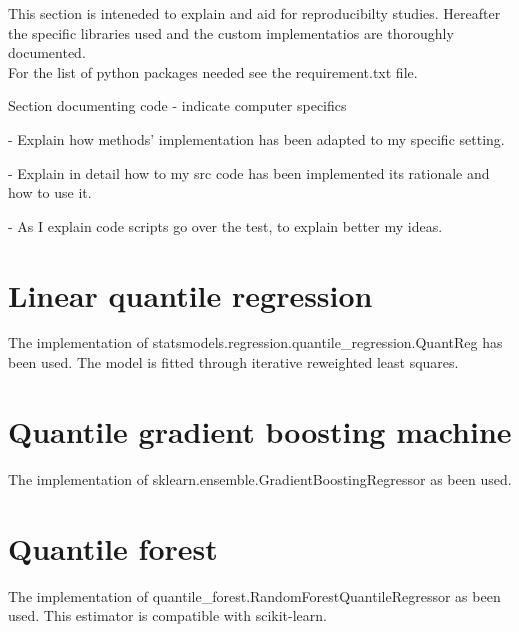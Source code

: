 This section is inteneded to explain and aid for reproducibilty studies. Hereafter the specific libraries used and the custom implementatios are thoroughly documented.
\\
For the list of python packages needed see the requirement.txt file.


Section documenting code
- indicate computer specifics


- Explain how methods' implementation has been
adapted to my specific setting.

- Explain in detail how to my src code has been implemented
its rationale and how to use it.

- As I explain code scripts go over the test, to 
explain better my ideas.
\section{Linear quantile regression}
The implementation of statsmodels.regression.quantile\_regression.QuantReg has been used.
The model is fitted through iterative reweighted least squares.
\section{Quantile gradient boosting machine}
The implementation of sklearn.ensemble.GradientBoostingRegressor as been used.
\section{Quantile forest}
The implementation of quantile\_forest.RandomForestQuantileRegressor as been used. This estimator is compatible with scikit-learn.
